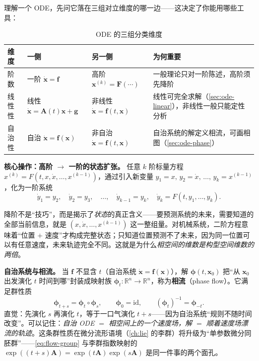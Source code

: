 理解一个 ODE，先问它落在三组对立维度的哪一边——这决定了你能用哪些工具：

\begin{table}[H]\centering\small
\caption{ODE 的三组分类维度}
\begin{tabular}{llll}
\toprule
维度 & 一侧 & 另一侧 & 为何重要 \\
\midrule
阶数 & 一阶 $\dot{\mathbf{x}}=\mathbf{f}$ & 高阶 $\mathbf{x}^{(k)}=\mathbf{F}(\cdots)$ & 一般理论只对一阶陈述，高阶须先降阶 \\
线性性 & 线性 $\dot{\mathbf{x}}=\mathbf{A}(t)\mathbf{x}+\mathbf{g}$ & 非线性 $\dot{\mathbf{x}}=\mathbf{f}(t,\mathbf{x})$ & 线性可完全求解（\cref{sec:ode-linear}），非线性一般只能定性分析 \\
自治性 & 自治 $\dot{\mathbf{x}}=\mathbf{f}(\mathbf{x})$ & 非自治 $\dot{\mathbf{x}}=\mathbf{f}(t,\mathbf{x})$ & 自治系统的解定义相流，可画相图（\cref{sec:ode-phase}） \\
\bottomrule
\end{tabular}
\end{table}

\textbf{核心操作：高阶 $\to$ 一阶的状态扩张。} 任意 $k$ 阶标量方程 $x^{(k)}=F(t,x,\dot x,\dots,x^{(k-1)})$，通过引入新变量 $y_1=x,\,y_2=\dot x,\,\dots,\,y_k=x^{(k-1)}$，化为一阶系统
\begin{equation}
  \dot y_1=y_2,\quad \dot y_2=y_3,\quad \dots,\quad \dot y_{k-1}=y_k,\quad \dot y_k=F(t,y_1,\dots,y_k).
  \label{eq:order-reduction}
\end{equation}

\begin{insight}
降阶不是“技巧”，而是揭示了\emph{状态}的真正含义——要预测系统的未来，需要知道的全部当前信息，就是 $(x,\dot x,\dots,x^{(k-1)})$ 这一整组量。对机械系统，二阶方程意味着“位置 $+$ 速度”才构成完整状态；只知道位置预测不了未来，因为同一位置可以有任意速度，未来轨迹完全不同。这就是为什么\emph{相空间的维数是构型空间维数的两倍}。
\end{insight}

\textbf{自治系统与相流。} 当 $\mathbf{f}$ 不显含 $t$（自治系统 $\dot{\mathbf{x}}=\mathbf{f}(\mathbf{x})$），解 $\boldsymbol{\phi}(t,\mathbf{x}_0)$ 把“从 $\mathbf{x}_0$ 出发演化 $t$ 时间到哪”封装成映射族 $\boldsymbol{\phi}_t:\mathbb{R}^n\to\mathbb{R}^n$，称为\textbf{相流}（phase flow）。它满足群性质
\begin{equation}
  \boldsymbol{\phi}_{t+s}=\boldsymbol{\phi}_t\circ\boldsymbol{\phi}_s,\qquad \boldsymbol{\phi}_0=\mathrm{id},\qquad (\boldsymbol{\phi}_t)^{-1}=\boldsymbol{\phi}_{-t}.
  \label{eq:flow-group}
\end{equation}
直觉：先演化 $s$ 再演化 $t$，等于一口气演化 $t+s$——因为自治系统“规则不随时间改变”。可以记住：\emph{自治 ODE $=$ 相空间上的一个速度场，解 $=$ 顺着速度场漂流的轨迹}。这条群性质在微分流形语境（\cref{ch:lie} 的李群）将升级为“单参数微分同胚群”——\cref{eq:flow-group} 与李群指数映射的 $\exp((t+s)\mathbf{A})=\exp(t\mathbf{A})\exp(s\mathbf{A})$ 是同一件事的两个面孔。

